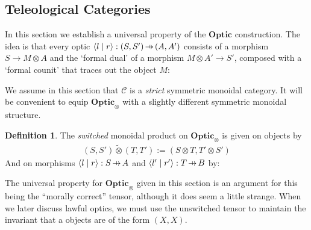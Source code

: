 \documentclass[11pt,a4paper]{article}
\theoremstyle{plain}
\theoremstyle{definition}
\newtheorem{definition}[theorem]{Definition}
\newcommand{\C}{\mathscr{C}}
\newcommand{\Optic}{\mathbf{Optic}}
\newcommand{\switched}{\mathbin{\tilde{\otimes}}}
\newcommand{\rep}[2]{{\ensuremath \left\langle #1 \mid #2 \right\rangle}}
\newcommand{\hto}{\ensuremath{\,\mathaccent\shortmid\rightarrow\,}}
\begin{document}
\subsection{Teleological Categories}
\label{teleological-categories}

In this section we establish a universal property of the $\Optic$ construction. The idea is that every optic $\rep{l}{r} : (S, S') \hto (A, A')$ consists of a morphism $S \to M \otimes A$ and the `formal dual' of a morphism $M \otimes A' \to S'$, composed with a `formal counit' that traces out the object $M$:
\begin{center}
  
\end{center}

We assume in this section that $\C$ is a \emph{strict} symmetric monoidal category. It will be convenient to equip $\Optic_\otimes$ with a slightly different symmetric monoidal structure. 

\begin{definition}
  The \emph{switched} monoidal product on $\Optic_\otimes$ is given on objects by
  \begin{align*}
    (S, S') \switched (T, T') := (S \otimes T, T' \otimes S')
  \end{align*}
  And on morphisms $\rep{l}{r} : S \hto A$ and $\rep{l'}{r'} : T \hto B$ by:
  \begin{center}
    
  \end{center}
\end{definition}

The universal property for $\Optic_\otimes$ given in this section is an argument for this being the ``morally correct'' tensor, although it does seem a little strange. When we later discuss lawful optics, we must use the unswitched tensor to maintain the invariant that a objects are of the form $(X, X)$.
\end{document}
